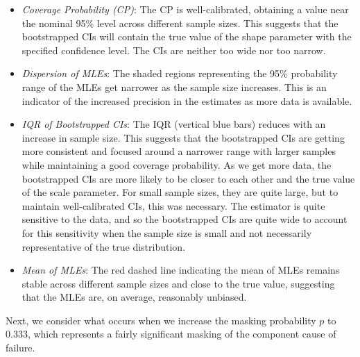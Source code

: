 \documentclass[
]{article}
\begin{document}
\begin{itemize}
\item
  \emph{Coverage Probability (CP)}: The CP is well-calibrated, obtaining
  a value near the nominal 95\% level across different sample sizes.
  This suggests that the bootstrapped CIs will contain the true value of
  the shape parameter with the specified confidence level. The CIs are
  neither too wide nor too narrow.
\item
  \emph{Dispersion of MLEs}: The shaded regions representing the 95\%
  probability range of the MLEs get narrower as the sample size
  increases. This is an indicator of the increased precision in the
  estimates as more data is available.
\item
  \emph{IQR of Bootstrapped CIs}: The IQR (vertical blue bars) reduces
  with an increase in sample size. This suggests that the bootstrapped
  CIs are getting more consistent and focused around a narrower range
  with larger samples while maintaining a good coverage probability. As
  we get more data, the bootstrapped CIs are more likely to be closer to
  each other and the true value of the scale parameter. For small sample
  sizes, they are quite large, but to maintain well-calibrated CIs, this
  was necessary. The estimator is quite sensitive to the data, and so
  the bootstrapped CIs are quite wide to account for this sensitivity
  when the sample size is small and not necessarily representative of
  the true distribution.
\item
  \emph{Mean of MLEs}: The red dashed line indicating the mean of MLEs
  remains stable across different sample sizes and close to the true
  value, suggesting that the MLEs are, on average, reasonably unbiased.
\end{itemize}

Next, we consider what occurs when we increase the masking probability
\(p\) to \(0.333\), which represents a fairly significant masking of the
component cause of failure.
\end{document}
